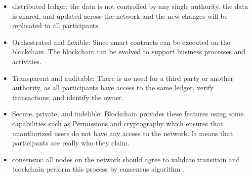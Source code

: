 \begin{itemize}
    \item distributed ledger: the data is not controlled by any single authority. the data is shared, and updated across the network and the new changes will be replicated to all participants.
    \item Orchestrated and flexible: Since smart contracts can be executed on the blockchain. The blockchain can be evolved to support business processes and activities.
    \item Transparent and auditable: There is no need for a third party or another authority, as all participants have access to the same ledger, verify transactions, and identify the owner. 
    \item Secure, private, and indelible:
    Blockchain provides these features using some capabilities such as Permissions and cryptography which ensures that  
    unauthorized users do not have any access to the network. It means that participants are really who they claim.
    \item consensus: all nodes on the network should agree to validate transition and blockchain perform this process by consensus algorithm \cite{Gupta}.
\end{itemize}

